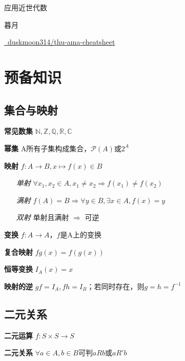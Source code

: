 \documentclass[a4paper,10pt]{ctexart}
\newcommand*{\setN}{\mathbb{N}}
\newcommand*{\setZ}{\mathbb{Z}}
\newcommand*{\setQ}{\mathbb{Q}}
\newcommand*{\setR}{\mathbb{R}}
\newcommand*{\setC}{\mathbb{C}}
\newcommand*{\powerset}[1]{\mathscr{P}(#1)}
\newcommand*{\impl}{\Rightarrow}
\begin{document}
\begin{multicols}{3}
    \begin{center}
        {\Large 应用近世代数}

        暮月

        \href{https://github.com/duskmoon314/thu-ama-cheatsheet}{\faGithub \  duskmoon314/thu-ama-cheatsheet}

        \vspace*{-1em}
    \end{center}

    \section{预备知识}

    \subsection{集合与映射}

    \textbf{常见数集} $\setN, \setZ, \setQ, \setR, \setC$

    \textbf{幂集} A所有子集构成集合，$\powerset{A}$或$2^A$

    \textbf{映射} $f: A \to B, x \mapsto f(x) \in B$

    \begin{itemize}
        \item[\emph{单射}] $\forall x_1, x_2 \!\in\! A, x_1 \!\neq\! x_2 \!\impl\! f(x_1) \!\neq\! f(x_2) $
        \item[\emph{满射}] $f(A) \! = \! B \impl \forall y \!\in\! B, \exists x \!\in\! A, f(x) = y$
        \item[\emph{双射}] 单射且满射 $\impl$ 可逆
    \end{itemize}

    \textbf{变换} $f: A \to A$，$f$是A上的变换

    \textbf{复合映射} $fg(x) = f(g(x))$

    \textbf{恒等变换} $I_A(x) = x$

    \textbf{映射的逆} $gf=I_A, fh=I_B$；若同时存在，则$g=h=f^{-1}$

    \subsection{二元关系}

    \textbf{二元运算} $f: S \times S \to S$

    \textbf{二元关系} $\forall a \!\in\! A, b \!\in\! B$可判$\!aRb\!$或$\!aR'b\!$


\end{multicols}
\end{document}
